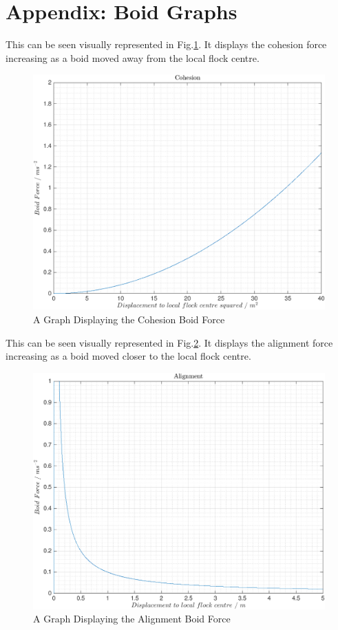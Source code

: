 
\section{Appendix: Boid Graphs}

This can be seen visually represented in Fig.\ref{fig:cohesion}. It displays the cohesion force increasing as a boid moved away from the local flock centre.
\begin{figure}[H]
	\includegraphics[width=\linewidth]{../Images/cohesion.png}
	\caption{A Graph Displaying the Cohesion Boid Force}
	\label{fig:cohesion}
\end{figure}

This can be seen visually represented in Fig.\ref{fig:alignment}. It displays the alignment force increasing as a boid moved closer to the local flock centre.
\begin{figure}[H]
	\includegraphics[width=\linewidth]{../Images/alignment.png}
	\caption{A Graph Displaying the Alignment Boid Force}
	\label{fig:alignment}
\end{figure}

